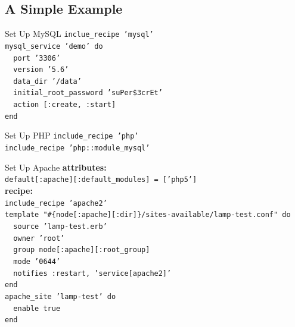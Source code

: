 \documentclass{beamer}
\begin{document}
    \subsection{A Simple Example}
    \begin{frame}{Set Up MySQL}
        \texttt{inclue\_recipe 'mysql'\\
            mysql\_service 'demo' do\\
            ~~port '3306'\\
            ~~version '5.6'\\
            ~~data\_dir '/data'\\
            ~~initial\_root\_password 'suPer\$3crEt'\\
            ~~action [:create, :start]\\
            end\\
        }
    \end{frame}
    \begin{frame}{Set Up PHP}
        \texttt{include\_recipe 'php'\\
            include\_recipe 'php::module\_mysql'\\
        }
    \end{frame}
    \begin{frame}{Set Up Apache}
        \textbf{attributes:}\\
        \small\texttt{default[:apache][:default\_modules] = ['php5']}\\
        \medskip
        \textbf{recipe:}\\
        \small\texttt{include\_recipe 'apache2'\\
            template "\#\{node[:apache][:dir]\}/sites-available/lamp-test.conf" do\\
            ~~source 'lamp-test.erb'\\
            ~~owner 'root'\\
            ~~group node[:apache][:root\_group]\\
            ~~mode '0644'\\
            ~~notifies :restart, 'service[apache2]'\\
            end\\
            \medskip
            apache\_site 'lamp-test' do\\
            ~~enable true\\
            end\\
        }
    \end{frame}
\end{document}
